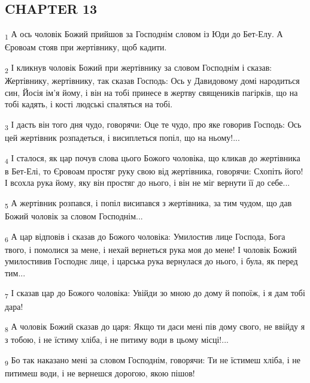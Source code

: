 \subsection{CHAPTER 13}
\begin{tcolorbox}
\textsubscript{1} А ось чоловік Божий прийшов за Господнім словом із Юди до Бет-Елу. А Єровоам стояв при жертівнику, щоб кадити.
\end{tcolorbox}
\begin{tcolorbox}
\textsubscript{2} І кликнув чоловік Божий при жертівнику за словом Господнім і сказав: Жертівнику, жертівнику, так сказав Господь: Ось у Давидовому домі народиться син, Йосія ім'я йому, і він на тобі принесе в жертву священиків пагірків, що на тобі кадять, і кості людські спаляться на тобі.
\end{tcolorbox}
\begin{tcolorbox}
\textsubscript{3} І дасть він того дня чудо, говорячи: Оце те чудо, про яке говорив Господь: Ось цей жертівник розпадеться, і висиплеться попіл, що на ньому!...
\end{tcolorbox}
\begin{tcolorbox}
\textsubscript{4} І сталося, як цар почув слова цього Божого чоловіка, що кликав до жертівника в Бет-Елі, то Єровоам простяг руку свою від жертівника, говорячи: Схопіть його! І всохла рука йому, яку він простяг до нього, і він не міг вернути її до себе...
\end{tcolorbox}
\begin{tcolorbox}
\textsubscript{5} А жертівник розпався, і попіл висипався з жертівника, за тим чудом, що дав Божий чоловік за словом Господнім...
\end{tcolorbox}
\begin{tcolorbox}
\textsubscript{6} А цар відповів і сказав до Божого чоловіка: Умилостив лице Господа, Бога твого, і помолися за мене, і нехай вернеться рука моя до мене! І чоловік Божий умилостивив Господнє лице, і царська рука вернулася до нього, і була, як перед тим...
\end{tcolorbox}
\begin{tcolorbox}
\textsubscript{7} І сказав цар до Божого чоловіка: Увійди зо мною до дому й попоїж, і я дам тобі дара!
\end{tcolorbox}
\begin{tcolorbox}
\textsubscript{8} А чоловік Божий сказав до царя: Якщо ти даси мені пів дому свого, не ввійду я з тобою, і не їстиму хліба, і не питиму води в цьому місці!...
\end{tcolorbox}
\begin{tcolorbox}
\textsubscript{9} Бо так наказано мені за словом Господнім, говорячи: Ти не їстимеш хліба, і не питимеш води, і не вернешся дорогою, якою пішов!
\end{tcolorbox}

